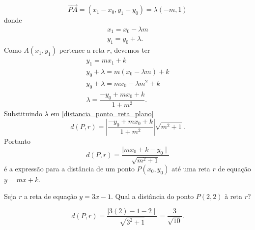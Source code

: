 \[
  \vec{PA} = (x_1 - x_0, y_1 - y_0) = \lambda(-m, 1)
\]
donde
\begin{align*}
  x_1 = x_0 - \lambda m\\
  y_1 = y_0 + \lambda.
\end{align*}
Como $A(x_1, y_1)$ pertence a reta $r$, devemos ter
\begin{align*}
  y_1 = mx_1 + k\\
  y_0 + \lambda = m(x_0 - \lambda m) + k\\
  y_0 + \lambda = mx_0 - \lambda m^2 + k\\
  \lambda = \dfrac{-y_0 + mx_0 + k}{1 + m^2}.
\end{align*}
Substituindo $\lambda$ em \eqref{distancia_ponto_reta_plano}
\[
  d(P, r) = \left|\dfrac{-y_0 + mx_0 + k}{1 + m^2}\right|\sqrt{m^2 + 1}.
\]
Portanto
\[
  d(P, r) = \dfrac{\mid mx_0 + k - y_0\mid}{\sqrt{m^2 + 1}}
\]
é a expressão para a dist\^ancia de um ponto $P(x_0,y_0)$ até uma reta $r$ de equação $y = mx + k$.

\begin{exemplos}
  Seja $r$ a reta de equação $y = 3x - 1$. Qual a dist\^ancia do ponto $P(2,2)$ à reta $r$?
  \begin{solucao}
    \[
      d(P,r) = \dfrac{\mid 3(2) - 1 - 2\mid}{\sqrt{3^2 + 1}} = \dfrac{3}{\sqrt{10}}.
    \]
  \end{solucao}
\end{exemplos}



